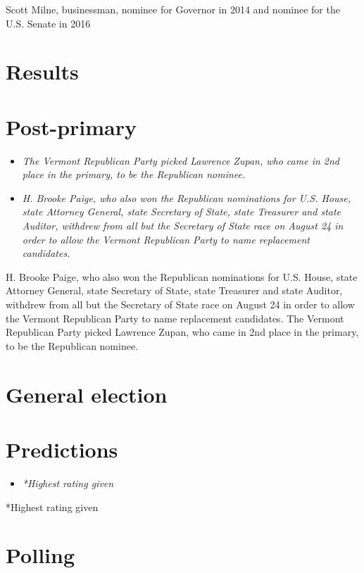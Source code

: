 Scott Milne, businessman, nominee for Governor in 2014 and nominee for
the U.S. Senate in 2016

\section{Results}\label{results-1}

\section{Post-primary}\label{post-primary}

\begin{itemize}
\item
  \emph{The Vermont Republican Party picked Lawrence Zupan, who came in
  2nd place in the primary, to be the Republican nominee.}
\item
  \emph{H. Brooke Paige, who also won the Republican nominations for
  U.S. House, state Attorney General, state Secretary of State, state
  Treasurer and state Auditor, withdrew from all but the Secretary of
  State race on August 24 in order to allow the Vermont Republican Party
  to name replacement candidates.}
\end{itemize}

H. Brooke Paige, who also won the Republican nominations for U.S. House,
state Attorney General, state Secretary of State, state Treasurer and
state Auditor, withdrew from all but the Secretary of State race on
August 24 in order to allow the Vermont Republican Party to name
replacement candidates. The Vermont Republican Party picked Lawrence
Zupan, who came in 2nd place in the primary, to be the Republican
nominee.

\section{General election}\label{general-election}

\section{Predictions}\label{predictions}

\begin{itemize}
\item
  \emph{*Highest rating given}
\end{itemize}

*Highest rating given

\section{Polling}\label{polling}

